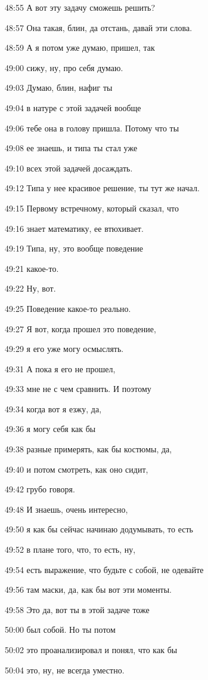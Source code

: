 48:55
А вот эту задачу сможешь решить?

48:57
Она такая, блин, да отстань, давай эти слова.

48:59
А я потом уже думаю, пришел, так

49:00
сижу, ну, про себя думаю.

49:03
Думаю, блин, нафиг ты

49:04
в натуре с этой задачей вообще

49:06
тебе она в голову пришла. Потому что ты

49:08
ее знаешь, и типа ты стал уже

49:10
всех этой задачей досаждать.

49:12
Типа у нее красивое решение, ты тут же начал.

49:15
Первому встречному, который сказал, что

49:16
знает математику, ее втюхивает.

49:19
Типа, ну, это вообще поведение

49:21
какое-то.

49:22
Ну, вот.

49:25
Поведение какое-то реально.

49:27
Я вот, когда прошел это поведение,

49:29
я его уже могу осмыслять.

49:31
А пока я его не прошел,

49:33
мне не с чем сравнить. И поэтому

49:34
когда вот я езжу, да,

49:36
я могу себя как бы

49:38
разные примерять, как бы костюмы, да,

49:40
и потом смотреть, как оно сидит,

49:42
грубо говоря.

49:48
И знаешь, очень интересно,

49:50
я как бы сейчас начинаю додумывать, то есть

49:52
в плане того, что, то есть, ну,

49:54
есть выражение, что будьте с собой, не одевайте

49:56
там маски, да, как бы вот эти моменты.

49:58
Это да, вот ты в этой задаче тоже

50:00
был собой. Но ты потом

50:02
это проанализировал и понял, что как бы

50:04
это, ну, не всегда уместно.

